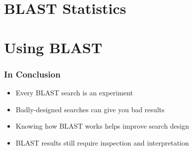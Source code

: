 \section{BLAST Statistics}
%
 
% 

% 
  
\section{Using BLAST}




%     

\begin{frame}
  \frametitle{In Conclusion}
  \begin{itemize}
    \item Every BLAST search is an experiment
    \item Badly-designed searches can give you bad results
    \item Knowing how BLAST works helps improve search design
    \item BLAST results still require inspection and interpretation
  \end{itemize}
\end{frame}     
    

